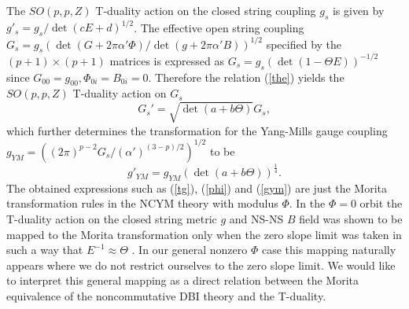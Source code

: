 \documentclass[12pt,a4paper]{article}
\newcommand{\al}{\alpha'}
\newcommand{\Te}{\Theta}
\begin{document}
The $SO(p,p,Z)$ T-duality action on the closed string coupling $g_s$ is
given by $g'_s = g_s/\det(cE+d)^{1/2}$. The effective open string 
coupling $G_s = g_s(\det(G+2\pi \al \Phi)/\det(g+2\pi\al B))^{1/2}$ 
specified by the $(p+1)\times(p+1)$ matrices is expressed as
$G_s  = g_s(\det(1-\Te E))^{-1/2}$ since $G_{00}=g_{00}, \Phi_{0i}
=B_{0i}=0$.  Therefore the relation (\ref{the}) yields the
$SO(p,p,Z)$ T-duality action on $G_s$
\begin{equation}
G_s' = \sqrt{\det(a + b\Te)}G_s,
\label{gs}\end{equation}
which further determines the transformation for the Yang-Mills gauge
coupling $g_{YM} =((2\pi)^{p-2}G_s/(\al)^{(3-p)/2})^{1/2}$ to be 
\begin{equation}
g'_{YM} = g_{YM}(\det(a + b\Te))^{\frac{1}{4}}.
\label{gym}\end{equation}
The obtained expressions such as (\ref{tg}), (\ref{phi}) and (\ref{gym})
are just the Morita transformation rules in the NCYM theory with modulus
$\Phi$. In the $\Phi = 0$ orbit the T-duality action on the closed string
metric $g$ and NS-NS $B$ field was shown to be mapped to the Morita 
transformation only when the zero slope limit was taken in such a way that
$E^{-1} \approx \Te$ \cite{SW}. In our general nonzero $\Phi$ case this 
mapping naturally appears where we do not restrict ourselves to the zero
slope limit. We would like to interpret this general mapping as a direct
relation between  the Morita equivalence of the 
noncommutative DBI theory and the T-duality.
\end{document}
